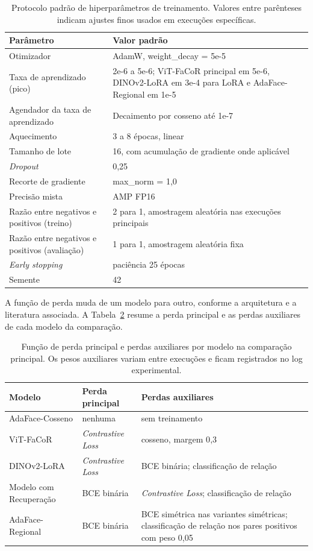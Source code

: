 \begin{table}[h]
\centering
\caption{Protocolo padrão de hiperparâmetros de treinamento. Valores entre parênteses indicam ajustes finos usados em execuções específicas.}
\label{tab:hyperparams}
\begin{tabularx}{\textwidth}{l X}
\hline
\textbf{Parâmetro} & \textbf{Valor padrão} \\
\hline
Otimizador & AdamW, weight\_decay = 5e-5 \\
Taxa de aprendizado (pico) & 2e-6 a 5e-6; ViT-FaCoR principal em 5e-6, DINOv2-LoRA em 3e-4 para LoRA e AdaFace-Regional em 1e-5 \\
Agendador da taxa de aprendizado & Decaimento por cosseno até 1e-7 \\
Aquecimento & 3 a 8 épocas, linear \\
Tamanho de lote & 16, com acumulação de gradiente onde aplicável \\
\textit{Dropout} & 0,25 \\
Recorte de gradiente & max\_norm = 1,0 \\
Precisão mista & AMP FP16 \\
Razão entre negativos e positivos (treino) & 2 para 1, amostragem aleatória nas execuções principais \\
Razão entre negativos e positivos (avaliação) & 1 para 1, amostragem aleatória fixa \\
\textit{Early stopping} & paciência 25 épocas \\
Semente & 42 \\
\hline
\end{tabularx}
\end{table}

A função de perda muda de um modelo para outro, conforme a arquitetura e a literatura associada. A Tabela~\ref{tab:perdas_por_modelo} resume a perda principal e as perdas auxiliares de cada modelo da comparação.

\begin{table}[h]
\centering
\caption{Função de perda principal e perdas auxiliares por modelo na comparação principal. Os pesos auxiliares variam entre execuções e ficam registrados no log experimental.}
\label{tab:perdas_por_modelo}
\begin{tabularx}{\textwidth}{l l X}
\hline
\textbf{Modelo} & \textbf{Perda principal} & \textbf{Perdas auxiliares} \\
\hline
AdaFace-Cosseno & nenhuma & sem treinamento \\
ViT-FaCoR & \textit{Contrastive Loss} & cosseno, margem 0{,}3 \\
DINOv2-LoRA & \textit{Contrastive Loss} & BCE binária; classificação de relação \\
Modelo com Recuperação & BCE binária & \textit{Contrastive Loss}; classificação de relação \\
AdaFace-Regional & BCE binária & BCE simétrica nas variantes simétricas; classificação de relação nos pares positivos com peso 0,05 \\
\hline
\end{tabularx}
\end{table}


